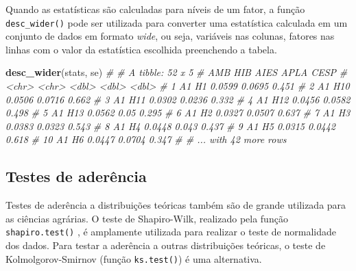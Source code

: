 \documentclass[
]{book}
\newenvironment{Shaded}{\begin{snugshade}}{\end{snugshade}}
\newcommand{\CommentTok}[1]{\textcolor[rgb]{0.56,0.35,0.01}{\textit{#1}}}
\newcommand{\KeywordTok}[1]{\textcolor[rgb]{0.13,0.29,0.53}{\textbf{#1}}}
\newcommand{\NormalTok}[1]{#1}
\numberwithin{equation}{section}
\newcommand{\indt}[1]{\index{#1|ST}}
\begin{document}
Quando as estatísticas são calculadas para níveis de um fator, a função \texttt{desc\_wider()} pode ser utilizada para converter uma estatística calculada em um conjunto de dados em formato \emph{wide}, ou seja, variáveis nas colunas, fatores nas linhas com o valor da estatística escolhida preenchendo a tabela.

\begin{Shaded}
\begin{Highlighting}[]
\KeywordTok{desc\_wider}\NormalTok{(stats, se)}
\CommentTok{\# \# A tibble: 52 x 5}
\CommentTok{\#    AMB   HIB     AIES   APLA  CESP}
\CommentTok{\#    \textless{}chr\textgreater{} \textless{}chr\textgreater{}  \textless{}dbl\textgreater{}  \textless{}dbl\textgreater{} \textless{}dbl\textgreater{}}
\CommentTok{\#  1 A1    H1    0.0599 0.0695 0.451}
\CommentTok{\#  2 A1    H10   0.0506 0.0716 0.662}
\CommentTok{\#  3 A1    H11   0.0302 0.0236 0.332}
\CommentTok{\#  4 A1    H12   0.0456 0.0582 0.498}
\CommentTok{\#  5 A1    H13   0.0562 0.05   0.295}
\CommentTok{\#  6 A1    H2    0.0327 0.0507 0.637}
\CommentTok{\#  7 A1    H3    0.0383 0.0323 0.543}
\CommentTok{\#  8 A1    H4    0.0448 0.043  0.437}
\CommentTok{\#  9 A1    H5    0.0315 0.0442 0.618}
\CommentTok{\# 10 A1    H6    0.0447 0.0704 0.347}
\CommentTok{\# \# ... with 42 more rows}
\end{Highlighting}
\end{Shaded}

\hypertarget{testes-de-aderuxeancia}{%
\subsection{Testes de aderência}\label{testes-de-aderuxeancia}}

Testes de aderência a distribuições teóricas também são de grande utilizada para as ciências agrárias. O teste de Shapiro-Wilk, realizado pela função \texttt{shapiro.test()} \indt{shapiro.test}, é amplamente utilizada para realizar o teste de normalidade dos dados. Para testar a aderência a outras distribuições teóricas, o teste de Kolmolgorov-Smirnov (função \texttt{ks.test()}) \indt{ks.test()} é uma alternativa.
\end{document}
